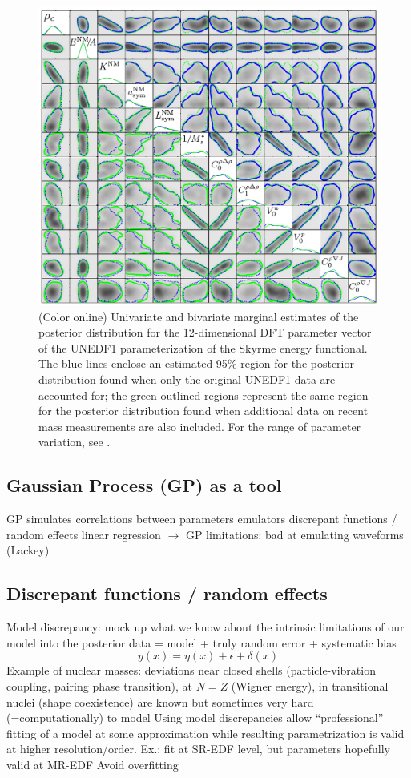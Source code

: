 \begin{figure}[h]
\begin{center}
\includegraphics[width=0.6\columnwidth]{figures/UNEDF1_posterior}
\caption{(Color online) Univariate and bivariate marginal estimates of the 
posterior distribution for the 12-dimensional DFT parameter vector of the 
UNEDF1 parameterization of the Skyrme energy functional. The blue lines enclose 
an estimated 95\% region for the posterior distribution found when only the 
original UNEDF1 data are accounted for; the green-outlined regions represent 
the same region for the posterior distribution found when additional data on 
recent mass measurements are also included. For the range of parameter variation, 
see \cite{mcdonnell2015}.
}
\label{fig:UNEDF1_posterior}
\end{center}
\end{figure}

\subsection{Gaussian Process (GP) as a tool}  \label{subsec:GP_tool}

\bi
  \I GP simulates correlations between parameters
  \I emulators
  \I discrepant functions / random effects 
  \I linear regression $\rightarrow$ GP
  \I limitations: bad at emulating waveforms (Lackey)
\ei

\subsection{Discrepant functions / random effects}  \label{subsec:discrepant}

\bi
  \I Model discrepancy: mock up what we know about the intrinsic limitations of 
     our model into the posterior
  \I data = model + truly random error + systematic bias
  $$ y(x) = \eta(x) + \epsilon + \delta(x) $$
  \I Example of nuclear masses: deviations near closed shells (particle-vibration 
     coupling, pairing phase transition), at $N=Z$ (Wigner energy), in transitional 
     nuclei (shape coexistence) are known but sometimes very hard (=computationally) 
     to model
  \I Using model discrepancies allow ``professional'' fitting of a model at some 
     approximation while resulting parametrization is valid at higher resolution/order.
     Ex.: fit at SR-EDF level, but parameters hopefully valid at MR-EDF
  \I Avoid overfitting
\ei

